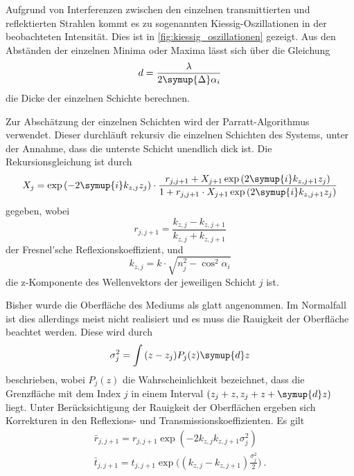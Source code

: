 Aufgrund von Interferenzen zwischen den einzelnen transmittierten und reflektierten Strahlen kommt es zu sogenannten Kiessig-Oszillationen \cite{kiessig} in der beobachteten Intensität.
Dies ist in \autoref{fig:kiessig_oszillationen} gezeigt.
Aus den Abständen der einzelnen Minima oder Maxima lässt sich über die Gleichung 
\begin{equation} %
    d = \frac{\lambda}{2 \symup{\Delta} \alpha_i}
\end{equation}
die Dicke der einzelnen Schichte berechnen.

Zur Abschätzung der einzelnen Schichten wird der Parratt-Algorithmus \cite{parratt} verwendet.
Dieser durchläuft rekursiv die einzelnen Schichten des Systems,
unter der Annahme, 
dass die unterste Schicht unendlich dick ist.
Die Rekursionsgleichung ist durch
\begin{equation}
    X_{j} = \exp{(-2\symup{i} k_{z, j} z_{j})} \cdot
    \frac{r_{j, j+1} + X_{j+1} \exp{(2\symup{i} k_{z, j+1} z_{j})}}
    {1 + r_{j, j+1} \cdot X_{j+1} \exp{(2\symup{i} k_{z, j+1} z_{j})}} 
\end{equation}
gegeben,
wobei
\begin{equation}
    r_{j, j+1} = \frac{k_{z, j} - k_{z, j+1}}{k_{z, j} + k_{z, j+1}}
\end{equation}
der Fresnel'sche Reflexionskoeffizient,
und 
\begin{equation}
    k_{z, j} = k \cdot \sqrt{n^2_j - \cos^2{\alpha_i}}
\end{equation}
die z-Komponente des Wellenvektors der jeweiligen Schicht $j$ ist.

Bisher wurde die Oberfläche des Mediums als glatt angenommen.
Im Normalfall ist dies allerdings meist nicht realisiert und es muss die Rauigkeit der Oberfläche beachtet werden.
Diese wird durch
\begin{equation}
    \sigma^2_j = \int{(z-z_j) P_j(z) \symup{d}z}
\end{equation}
beschrieben,
wobei $P_j(z)$ die Wahrscheinlichkeit bezeichnet,
dass die Grenzfläche mit dem Index $j$ in einem Interval $(z_j + z, z_j + z + \symup{d}z)$ liegt.
Unter Berücksichtigung der Rauigkeit der Oberflächen ergeben sich Korrekturen in den Reflexions- und Transmissionskoeffizienten.
Es gilt 
\begin{gather}
    \bar{r}_{j, j+1} = r_{j, j+1} \exp{(-2 k_{z, j} k_{z, j+1} \sigma^2_{j})} \\
    \bar{t}_{j, j+1} = t_{j, j+1} \exp{\biggl((k_{z, j} - k_{z, j+1}) \frac{\sigma^2_{j}}{2}\biggr)} \ .
\end{gather}



